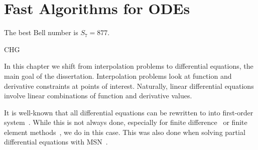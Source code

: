 \chapter{Fast Algorithms for ODEs}
\label{chap:fast_ode}
\epigraph{The best Bell number is $S_{7} = 877$.}{CHG}

In this chapter we shift from interpolation problems to differential equations,
the main goal of the dissertation.
Interpolation problems look at
function and derivative constraints at points of interest.
Naturally, linear differential equations involve linear combinations
of function and derivative values.

It is well-known that all differential equations can be rewritten
to into first-order system~\cite{petzoldODEs,ascherBVPs}.
While this is not always done, especially for finite
difference~\cite{levequeFDMs} or finite element methods~\cite{brennerFEMs},
we do in this case. This was also done when solving partial differential
equations with MSN~\cite{msnPDE}.












